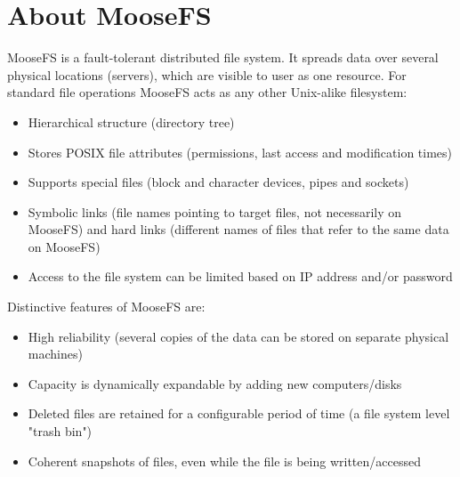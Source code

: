 \documentclass[a4paper,11pt,english]{report}
\begin{document}
	\vfill
	
	\tableofcontents
	
	\chapter{About MooseFS}
		MooseFS  is a fault-tolerant distributed file system. It spreads data over several physical locations (servers), which are visible to user as one resource. For standard file operations MooseFS acts as any other Unix-alike filesystem:
	
	\begin{itemize}
		\item Hierarchical structure (directory tree)
		\item Stores POSIX file attributes (permissions, last access and modification times)
		\item Supports special files (block and character devices, pipes and sockets)
		\item Symbolic links (file names pointing to target files, not necessarily on MooseFS) and hard links (different names of files that refer to the same data on MooseFS)
		\item Access to the file system can be limited based on IP address and/or password
	\end{itemize}

	\bigskip
	Distinctive features of MooseFS are:
	\begin{itemize}
		\item High reliability (several copies of the data can be stored on separate physical machines)
		\item Capacity is dynamically expandable by adding new computers/disks
		\item Deleted files are retained for a configurable period of time (a file system level "trash bin")
		\item Coherent snapshots of files, even while the file is being written/accessed
	\end{itemize}
\end{document}
